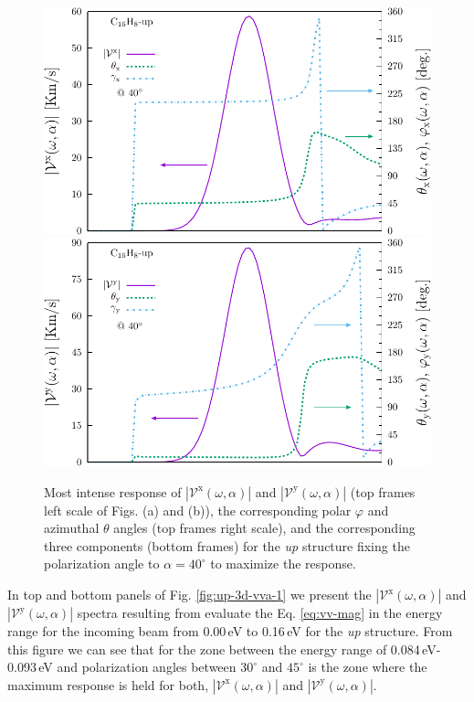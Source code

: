 \documentclass[prb,11pt,tightenlines,twocolumn,aps]{revtex4-1}
\begin{document}
\begin{figure}[t]
    \centering
    \includegraphics[width=\linewidth]{upplots/up-vxb-rtp-m1}
    \\
    \includegraphics[width=\linewidth]{upplots/up-vyb-rtp-m1}
    
    \caption{Most intense response of
    $|\mathcal{V}^{\mathrm{x}}(\omega,\alpha)|$ and
    $|\mathcal{V}^{\mathrm{y}}(\omega,\alpha)|$ (top frames left scale of Figs.
    (a) and (b)), the corresponding polar $\varphi$ and azimuthal $\theta$
    angles (top frames right scale), and the corresponding three components
    (bottom frames) for the \emph{up} structure fixing the polarization angle
    to $\alpha=40^{\circ}$ to maximize the response.}
    \label{fig:up-vab-comp-rtp-1}
\end{figure}

In top and bottom panels of Fig. \ref{fig:up-3d-vva-1} we present the
$|\mathcal{V}^{\mathrm{x}}(\omega,\alpha)|$ and
$|\mathcal{V}^{\mathrm{y}}(\omega,\alpha)|$ spectra resulting from evaluate the
Eq. \eqref{eq:vv-mag} in the energy range for the incoming beam from 0.00\,eV
to 0.16\,eV for the \emph{up} structure.
%
From this figure we can see that for the zone between the energy range of
0.084\,eV-0.093\,eV and polarization angles between $30^{\circ}$ and
$45^{\circ}$ is the zone where the maximum response is held for both,
$|\mathcal{V}^{\mathrm{x}}(\omega,\alpha)|$ and
$|\mathcal{V}^{\mathrm{y}}(\omega,\alpha)|$.
\end{document}
